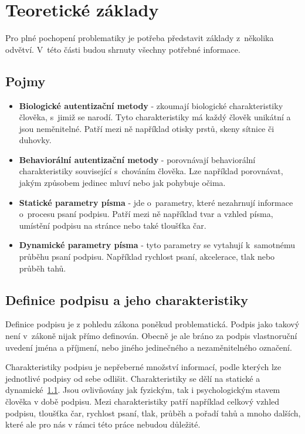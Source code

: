 
\chapter{Teoretické základy}
Pro plné pochopení problematiky je potřeba představit základy z~několika odvětví. 
V~této části budou shrnuty všechny potřebné informace. 

\section{Pojmy}
\label{sec:pojmy}
\begin{itemize}
  \item{\textbf{Biologické autentizační metody} - zkoumají biologické charakteristiky člověka, s~jimiž se narodí. Tyto charakteristiky má každý člověk unikátní a jsou neměnitelné. Patří mezi ně například otisky prstů, skeny sítnice či duhovky.}  
  \item{\textbf{Behaviorální autentizační metody} - porovnávají behaviorální charakteristiky související s~chováním člověka. Lze například porovnávat, jakým způsobem jedinec mluví nebo jak pohybuje očima.}
  \item{\textbf{Statické parametry písma} - jde o~parametry, které nezahrnují informace o~procesu psaní podpisu. Patří mezi ně například tvar a vzhled písma, umístění podpisu na stránce nebo také tloušťka čar.}
  \item{\textbf{Dynamické parametry písma} - tyto parametry se vytahují k~samotnému průběhu psaní podpisu. Například rychlost psaní, akcelerace, tlak nebo průběh tahů.}
\end{itemize}

\section{Definice podpisu a jeho charakteristiky}
Definice podpisu je z pohledu zákona poněkud problematická. 
Podpis jako takový není v~zákoně nijak přímo definován. 
Obecně je ale bráno za podpis vlastnoruční uvedení jména a příjmení, nebo jiného jedinečného a nezaměnitelného označení. %

Charakteristiky podpisu je nepřeberné množství informací, podle kterých lze jednotlivé podpisy od sebe odlišit. 
Charakteristiky se dělí na statické a dynamické~\ref{sec:pojmy}. 
Jsou ovlivňovány jak fyzickým, tak i psychologickým stavem člověka v době podpisu.
Mezi charakteristiky patří například celkový vzhled podpisu, tloušťka čar, rychlost psaní, tlak, průběh a pořadí tahů a mnoho dalších, které ale pro nás v rámci této práce nebudou důležité. %

